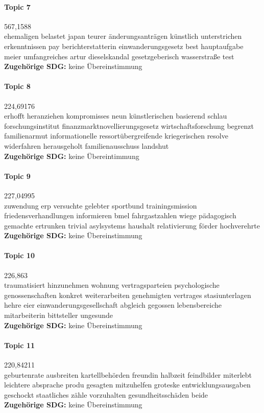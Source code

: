 \documentclass[a4paper,11pt]{article}
\begin{document}
\paragraph{Topic 7} 567,1588 \\
ehemaligen belastet japan teurer änderungsanträgen künstlich unterstrichen
erkenntnissen pay berichterstatterin einwanderungsgesetz best hauptaufgabe
meier umfangreiches artur dieselskandal gesetzgeberisch wasserstraße test   \\
\textbf{Zugehörige SDG:} keine Übereinstimmung
  
\paragraph{Topic 8} 224,69176 \\
erhofft heranziehen kompromisses neun künstlerischen basierend schlau
forschungsinstitut finanzmarktnovellierungsgesetz wirtschaftsforschung
begrenzt familienarmut informationelle ressortübergreifende kriegerischen
resolve widerfahren herausgeholt familienausschuss landshut \\ 
\textbf{Zugehörige SDG:} keine Übereintimmung
    
\paragraph{Topic 9} 227,04995 \\
zuwendung erp versuchte gelebter sportbund trainingsmission
friedensverhandlungen informieren bmel fahrgastzahlen wiege pädagogisch
gemachte ertrunken trivial asylsystems haushalt relativierung förder
hochverehrte \\
\textbf{Zugehörige SDG:} keine Übereinstimmung

\paragraph{Topic 10} 226,863 \\
traumatisiert hinzunehmen wohnung vertragsparteien psychologische
genossenschaften konkret weiterarbeiten genehmigten vertrages stasiunterlagen
hehre eier einwanderungsgesellschaft abgleich gegossen lebensbereiche
mitarbeiterin bittsteller ungesunde   \\ 
\textbf{Zugehörige SDG:} keine Übereinstimmung

\paragraph{Topic 11} 220,84211 \\
geburtenrate ausbreiten kartellbehörden freundin halbzeit feindbilder
miterlebt leichtere absprache produ gesagten mitzuhelfen groteske
entwicklungsausgaben geschockt staatliches zähle vorzuhalten
gesundheitsschäden beide  \\
\textbf{Zugehörige SDG:} keine Übereinstimmung 
    
\end{document}
